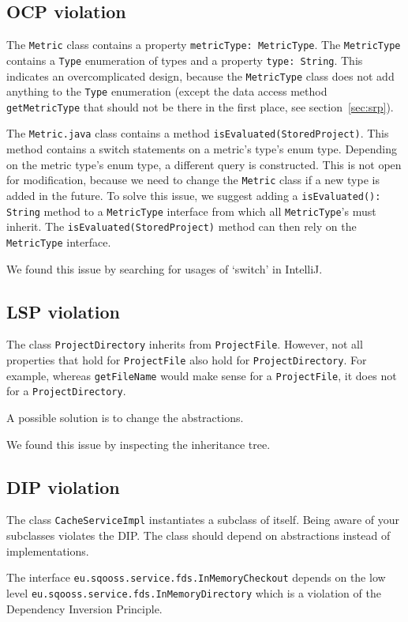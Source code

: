 \documentclass{article}
\begin{document}
\subsection{OCP violation}
The \verb|Metric| class contains a property \verb|metricType: MetricType|. The \verb|MetricType| contains a \verb|Type| enumeration of types and a property \verb|type: String|. This indicates an overcomplicated design, because the \verb|MetricType| class does not add anything to the \verb|Type| enumeration (except the data access method \verb|getMetricType| that should not be there in the first place, see section~\ref{sec:srp}).

The \verb|Metric.java| class contains a method \verb|isEvaluated(StoredProject)|. This method contains a switch statements on a metric's type's enum type. Depending on the metric type's enum type, a different query is constructed. This is not open for modification, because we need to change the \verb|Metric| class if a new type is added in the future. To solve this issue, we suggest adding a \verb|isEvaluated(): String| method to a \verb|MetricType| interface from which all \verb|MetricType|'s must inherit. The \verb|isEvaluated(StoredProject)| method can then rely on the \verb|MetricType| interface.

We found this issue by searching for usages of `switch' in IntelliJ.

\subsection{LSP violation}
The class \verb|ProjectDirectory| inherits from \verb|ProjectFile|. However, not all properties that hold for \verb|ProjectFile| also hold for \verb|ProjectDirectory|. For example, whereas \verb|getFileName| would make sense for a \verb|ProjectFile|, it does not for a \verb|ProjectDirectory|.

A possible solution is to change the abstractions.

We found this issue by inspecting the inheritance tree.

\subsection{DIP violation}
The class \verb|CacheServiceImpl| instantiates a subclass of itself. Being aware of your subclasses violates the DIP. The class should depend on abstractions instead of implementations.

The interface \verb|eu.sqooss.service.fds.InMemoryCheckout| depends on the low level \verb|eu.sqooss.service.fds.InMemoryDirectory| which is a violation of the Dependency Inversion Principle. %
\end{document}

